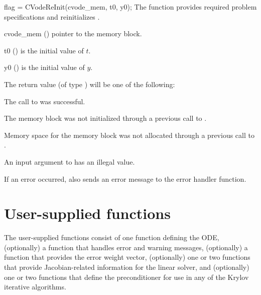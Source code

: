 {
  flag = CVodeReInit(cvode\_mem, t0, y0);
}
{
  The function  provides required problem specifications
  and reinitializes {\cvodes}.
}
{
  \begin{args}
  \item[cvode\_mem] ()
    pointer to the {\cvodes} memory block.
  \item[t0] ()
    is the initial value of $t$.
  \item[y0] ()
    is the initial value of $y$.
  \end{args}
}
{
  The return value  (of type ) will be one of the following:
  \begin{args}[CV\_NO\_MALLOC]
  \item[\Id{CV\_SUCCESS}]
    The call to  was successful.
  \item[\Id{CV\_MEM\_NULL}]
    The {\cvodes} memory block was not initialized through a
    previous call to .
  \item[\Id{CV\_NO\_MALLOC}]
    Memory space for the {\cvodes} memory block was not allocated through a
    previous call to .
  \item[\Id{CV\_ILL\_INPUT}]
    An input argument to  has an illegal value.
  \end{args}
}
{
  If an error occurred,  also sends an error message to the
  error handler function.
}


\section{User-supplied functions}\label{ss:user_fct_sim}

The user-supplied functions consist of one function defining the ODE,
(optionally) a function that handles error and warning messages,
(optionally) a function that provides the error weight vector,
(optionally) one or two functions that provide Jacobian-related
information for the linear solver, and
(optionally) one or two functions that define the preconditioner for
use in any of the Krylov iterative algorithms.

